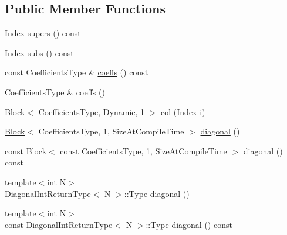 \subsection*{Public Member Functions}
\begin{DoxyCompactItemize}
\item 
\hyperlink{group___core___module_a554f30542cc2316add4b1ea0a492ff02}{Index} \hyperlink{class_eigen_1_1internal_1_1_band_matrix_base_a58617da0d75d22b1f8dfdfde702ebb4a}{supers} () const
\item 
\hyperlink{group___core___module_a554f30542cc2316add4b1ea0a492ff02}{Index} \hyperlink{class_eigen_1_1internal_1_1_band_matrix_base_a1115fe9b5a07d5218dacc15655a413cb}{subs} () const
\item 
const Coefficients\+Type \& \hyperlink{class_eigen_1_1internal_1_1_band_matrix_base_ab7c9e9a7ca5ad0f2f3a82ac582650499}{coeffs} () const
\item 
Coefficients\+Type \& \hyperlink{class_eigen_1_1internal_1_1_band_matrix_base_ab296a77fa3ac9c7618957b01c7de0a35}{coeffs} ()
\item 
\hyperlink{group___core___module_class_eigen_1_1_block}{Block}$<$ Coefficients\+Type, \hyperlink{namespace_eigen_ad81fa7195215a0ce30017dfac309f0b2}{Dynamic}, 1 $>$ \hyperlink{class_eigen_1_1internal_1_1_band_matrix_base_aca78a4990b6827b0b3086e28e6ae4257}{col} (\hyperlink{group___core___module_a554f30542cc2316add4b1ea0a492ff02}{Index} i)
\item 
\hyperlink{group___core___module_class_eigen_1_1_block}{Block}$<$ Coefficients\+Type, 1, Size\+At\+Compile\+Time $>$ \hyperlink{class_eigen_1_1internal_1_1_band_matrix_base_abce1c4d69e72ec594f67a841d1040606}{diagonal} ()
\item 
const \hyperlink{group___core___module_class_eigen_1_1_block}{Block}$<$ const Coefficients\+Type, 1, Size\+At\+Compile\+Time $>$ \hyperlink{class_eigen_1_1internal_1_1_band_matrix_base_a7c55438da88b00d29f8f514bddfa86ba}{diagonal} () const
\item 
{\footnotesize template$<$int N$>$ }\\\hyperlink{struct_eigen_1_1internal_1_1_band_matrix_base_1_1_diagonal_int_return_type}{Diagonal\+Int\+Return\+Type}$<$ N $>$\+::Type \hyperlink{class_eigen_1_1internal_1_1_band_matrix_base_a1d98143681d5c1e2709ce18332a939dc}{diagonal} ()
\item 
{\footnotesize template$<$int N$>$ }\\const \hyperlink{struct_eigen_1_1internal_1_1_band_matrix_base_1_1_diagonal_int_return_type}{Diagonal\+Int\+Return\+Type}$<$ N $>$\+::Type \hyperlink{class_eigen_1_1internal_1_1_band_matrix_base_aa8a5c997afb4ebd9b43b9ff2e1078cf9}{diagonal} () const

\end{DoxyCompactItemize}
